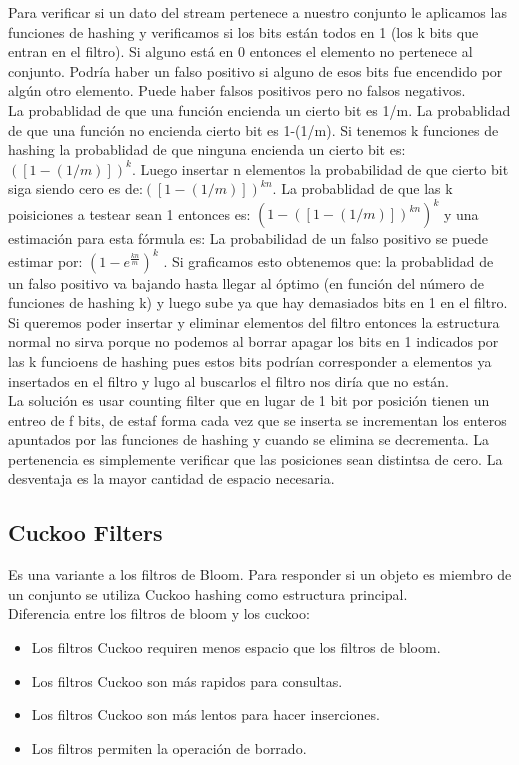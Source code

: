 \documentclass[titlepage,a4paper]{article}
\begin{document}
Para verificar si un dato del stream pertenece a nuestro conjunto le aplicamos las funciones de hashing y verificamos si los bits están todos en 1 (los k bits que  entran en el filtro). Si alguno está en 0 entonces el elemento no pertenece al conjunto. Podría haber un falso positivo si alguno de esos bits fue encendido por algún otro elemento. Puede haber falsos positivos pero no falsos negativos.  \\

La probablidad de que una función encienda un cierto bit es 1/m. La probablidad de que una función no encienda cierto bit es 1-(1/m). Si tenemos k funciones de hashing la probablidad de que ninguna encienda un cierto bit es:$([1-(1/m)])^k$. Luego insertar n elementos la probabilidad de que cierto bit siga siendo cero es de:$([1-(1/m)])^{kn}$. La probablidad de que las k poisiciones a testear sean 1 entonces es: $(1-([1-(1/m)])^{kn})^k$ y una estimación para esta fórmula es: La probabilidad de un falso positivo se puede estimar por: $(1-e^{\frac{kn}{m}})^k$ . Si graficamos esto obtenemos que: la probablidad de un falso positivo va bajando hasta llegar al óptimo (en función del número de funciones de hashing k) y luego sube ya que hay demasiados bits en 1 en el filtro.\\

Si queremos poder insertar y eliminar elementos del filtro entonces la estructura normal no sirva porque no podemos al borrar apagar los bits en 1 indicados por las k funcioens de hashing pues estos bits podrían corresponder a elementos ya insertados en el filtro y lugo al buscarlos el filtro nos diría que no están. \\

La solución es usar counting filter que en lugar de 1 bit por posición tienen un entreo de f bits, de estaf forma cada vez que se inserta se incrementan los enteros apuntados por las funciones de hashing y cuando se elimina se decrementa. La pertenencia es simplemente verificar que las posiciones sean distintsa de cero. La desventaja es la mayor cantidad de espacio necesaria. 

\subsection*{Cuckoo Filters}
Es una variante a los filtros de Bloom. Para responder si un objeto es miembro de un conjunto se utiliza Cuckoo hashing como estructura principal. \\

Diferencia entre los filtros de bloom y los cuckoo: 
\begin{itemize}
\item Los filtros Cuckoo requiren menos espacio que los filtros de bloom. 
\item Los filtros Cuckoo son más rapidos para consultas. 
\item Los filtros Cuckoo son más lentos para hacer inserciones. 
\item Los filtros permiten la operación de borrado. 
\end{itemize}
\end{document}
